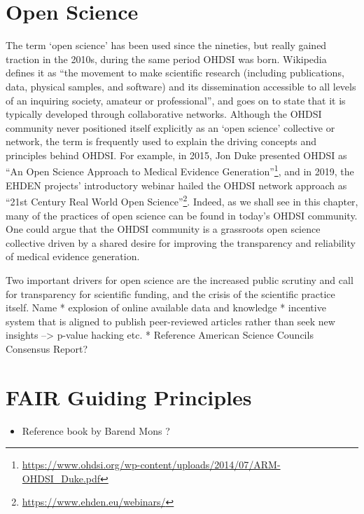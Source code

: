 \documentclass[11pt]{book}
\providecommand{\tightlist}{%
  \setlength{\itemsep}{0pt}\setlength{\parskip}{0pt}}
\let\rmarkdownfootnote\footnote%
\def\footnote{\protect\rmarkdownfootnote}
\begin{document}
\section{Open Science}\label{open-science}

The term `open science' has been used since the nineties, but really
gained traction in the 2010s, during the same period OHDSI was born.
Wikipedia \citep{wiki:Open_science} defines it as ``the movement to make
scientific research (including publications, data, physical samples, and
software) and its dissemination accessible to all levels of an inquiring
society, amateur or professional'', and goes on to state that it is
typically developed through collaborative networks. Although the OHDSI
community never positioned itself explicitly as an `open science'
collective or network, the term is frequently used to explain the
driving concepts and principles behind OHDSI. For example, in 2015, Jon
Duke presented OHDSI as ``An Open Science Approach to Medical Evidence
Generation''\footnote{\url{https://www.ohdsi.org/wp-content/uploads/2014/07/ARM-OHDSI_Duke.pdf}},
and in 2019, the EHDEN projects' introductory webinar hailed the OHDSI
network approach as ``21st Century Real World Open Science''\footnote{\url{https://www.ehden.eu/webinars/}}.
Indeed, as we shall see in this chapter, many of the practices of open
science can be found in today's OHDSI community. One could argue that
the OHDSI community is a grassroots open science collective driven by a
shared desire for improving the transparency and reliability of medical
evidence generation.

Two important drivers for open science are the increased public scrutiny
and call for transparency for scientific funding, and the crisis of the
scientific practice itself. Name * explosion of online available data
and knowledge * incentive system that is aligned to publish
peer-reviewed articles rather than seek new insights --\textgreater{}
p-value hacking etc. * Reference American Science Councils Consensus
Report?

\section{FAIR Guiding Principles}\label{fair-guiding-principles}

\begin{itemize}
\tightlist
\item
  Reference book by Barend Mons \citet{barendmons2018}?
\end{itemize}
\end{document}
